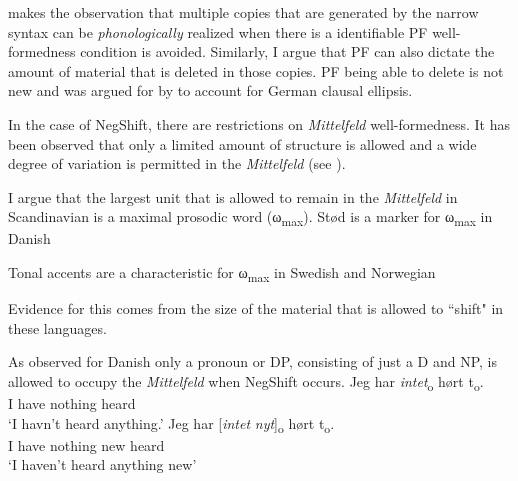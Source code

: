\documentclass[12pt, letterpaper]{article}
\newcommand{\sub}[1]{\textsubscript{#1}}
\begin{document}
\ex \citet{kandybowiczGrammarRepetitionNupe2008} makes the observation that multiple copies that are generated by the narrow syntax can be \emph{phonologically} realized when there is a identifiable PF well-formedness condition is avoided. 
	\ea Similarly, I argue that PF can also dictate the amount of material that is deleted in those copies. 
	\ex PF being able to delete is not new and was argued for by \citet{ottDeletionClausalEllipsis2016} to account for German clausal ellipsis. 
	\z 

\ex In the case of NegShift, there are restrictions on \emph{Mittelfeld} well-formedness. 
	\ea It has been observed that only a limited amount of structure is allowed and a wide degree of variation is permitted in the \emph{Mittelfeld} (see \cite{haiderMittelfeldPhenomenaScrambling2017}). 

	\ex I argue that the largest unit that is allowed to remain in the \emph{Mittelfeld} in Scandinavian is a maximal prosodic word (ω\sub{max}).
		\ea Stød is a marker for ω\sub{max} in Danish \citep{basbollPhonologyDanish2005,kalivodaProsodicRecursionPseudocyclicity2018}
	
		\ex Tonal accents are a characteristic for ω\sub{max} in Swedish and Norwegian \citep{kristoffersenPhonologyNorwegian2007,myrbergProsodicWordSwedish2013,myrbergProsodicHierarchySwedish2015,riadPhonologySwedish2014}

		\z  

	\z 

\ex Evidence for this comes from the size of the material that is allowed to ``shift" in these languages. 

\ex As observed for Danish only a pronoun or DP, consisting of just a D and NP, is allowed to occupy the \emph{Mittelfeld} when NegShift occurs. 
	\ea 
	\gll Jeg har \textit{intet}\textsubscript{o} hørt t\textsubscript{o}.\\
	I have nothing heard\\
	\glt  `I havn't heard anything.'
	\ex 
	\gll Jeg har [\textit{intet} \textit{nyt}]\textsubscript{o} hørt t\textsubscript{o}.\\
	I have nothing new heard\\
	\glt `I haven't heard anything new'
	\z
\end{document}
